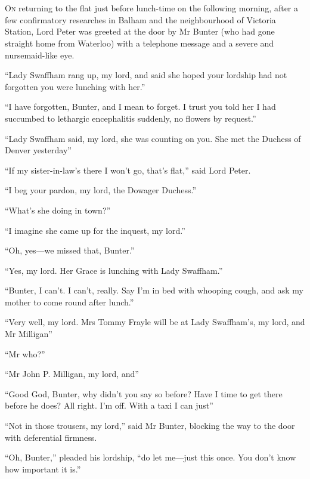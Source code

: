 \chapter[Chapter \thechapter]{}
\lettrine[lines=4]{O}{n} returning to the flat just before lunch-time on the following morning, after a few confirmatory researches in Balham and the neighbourhood of Victoria Station, Lord Peter was greeted at the door by Mr Bunter (who had gone straight home from Waterloo) with a telephone message and a severe and nursemaid-like eye.

\enquote{Lady Swaffham rang up, my lord, and said she hoped your lordship had not forgotten you were lunching with her.}

\enquote{I have forgotten, Bunter, and I mean to forget. I trust you told her I had succumbed to lethargic encephalitis suddenly, no flowers by request.}

\enquote{Lady Swaffham said, my lord, she was counting on you. She met the Duchess of Denver yesterday\longdash}

\enquote{If my sister-in-law’s there I won’t go, that’s flat,} said Lord Peter.

\enquote{I beg your pardon, my lord, the Dowager Duchess.}

\enquote{What’s she doing in town?}

\enquote{I imagine she came up for the inquest, my lord.}

\enquote{Oh, yes\allowbreak---\allowbreak we missed that, Bunter.}

\enquote{Yes, my lord. Her Grace is lunching with Lady Swaffham.}

\enquote{Bunter, I can’t. I can’t, really. Say I’m in bed with whooping cough, and ask my mother to come round after lunch.}

\enquote{Very well, my lord. Mrs Tommy Frayle will be at Lady Swaffham’s, my lord, and Mr Milligan\longdash}

\enquote{Mr who?}

\enquote{Mr John P. Milligan, my lord, and\longdash}

\enquote{Good God, Bunter, why didn’t you say so before? Have I time to get there before he does? All right. I’m off. With a taxi I can just\longdash}

\enquote{Not in those trousers, my lord,} said Mr Bunter, blocking the way to the door with deferential firmness.

\enquote{Oh, Bunter,} pleaded his lordship, \enquote{do let me\allowbreak---\allowbreak just this once. You don’t know how important it is.}

